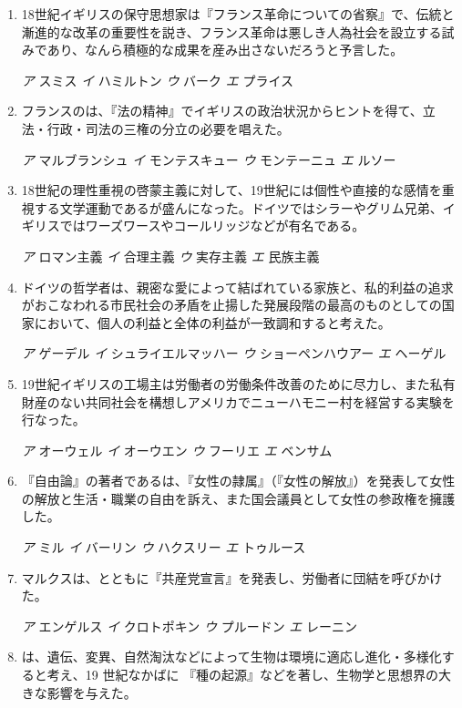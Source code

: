 \documentclass[uplatex,dvipdfmx]{jsarticle}
\newcommand{\sentakusi}[4]{
\hspace{.3zw}
\emph{ア}\hspace{1zw} #1 \hspace{2zw} \emph{イ} \hspace{1zw}#2 \hspace{2zw}\emph{ウ}\hspace{1zw} #3 \hspace{2zw}\emph{エ}\hspace{1zw} #4

}
\begin{document}
\begin{enumerate}
\sentakusi
{カント}
{シェリング}
{ヘーゲル}
{フィヒテ}


\item   18世紀イギリスの保守思想家は『フランス革命についての省察』で、伝統と漸進的な改革の重要性を説き、フランス革命は悪しき人為社会を設立する試みであり、なんら積極的な成果を産み出さないだろうと予言した。

\sentakusi
{スミス}
{ハミルトン}
{バーク}
{プライス}

\item   フランスのは、『法の精神』でイギリスの政治状況からヒントを得て、立法・行政・司法の三権の分立の必要を唱えた。

\sentakusi
{マルブランシュ}
{モンテスキュー}
{モンテーニュ}
{ルソー}


\item   18世紀の理性重視の啓蒙主義に対して、19世紀には個性や直接的な感情を重視する文学運動であるが盛んになった。ドイツではシラーやグリム兄弟、イギリスではワーズワースやコールリッジなどが有名である。

\sentakusi
{ロマン主義}
{合理主義}
{実存主義}
{民族主義}

\item   ドイツの哲学者は、親密な愛によって結ばれている家族と、私的利益の追求がおこなわれる市民社会の矛盾を止揚した発展段階の最高のものとしての国家において、個人の利益と全体の利益が一致調和すると考えた。

\sentakusi
{ゲーデル}
{シュライエルマッハー}
{ショーペンハウアー}
{ヘーゲル}

\item   19世紀イギリスの工場主は労働者の労働条件改善のために尽力し、また私有財産のない共同社会を構想しアメリカでニューハモニー村を経営する実験を行なった。

\sentakusi
{オーウェル}
{オーウエン}
{フーリエ}
{ベンサム}


\item 『自由論』の著者であるは、『女性の隷属』（『女性の解放』）を発表して女性の解放と生活・職業の自由を訴え、また国会議員として女性の参政権を擁護した。

\sentakusi
{ミル}
{バーリン}
{ハクスリー}
{トゥルース}


\item   マルクスは、とともに『共産党宣言』を発表し、労働者に団結を呼びかけた。

\sentakusi
{エンゲルス}
{クロトポキン}
{プルードン}
{レーニン}


\item   {}は、遺伝、変異、自然淘汰などによって生物は環境に適応し進化・多様化すると考え、19 世紀なかばに 『種の起源』などを著し、生物学と思想界の大きな影響を与えた。


\end{enumerate}
\end{document}

